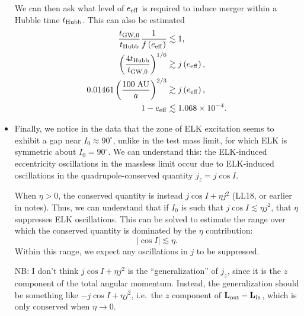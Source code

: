 \documentclass[11pt,
        usenames, %
        dvipsnames %
    ]{article}
\newcommand*{\bm}[1]{\boldsymbol{\mathbf{#1}}}
\newcommand*{\abs}[1]{\left|#1\right|}
\newcommand*{\p}[1]{\left(#1\right)}
\begin{document}
\begin{itemize}
        We can then ask what level of $e_{\rm eff}$ is required to induce
        merger within a Hubble time $t_{\rm Hubb}$. This can also be estimated
        \begin{align}
            \frac{t_{\rm GW, 0}}{t_{\rm Hubb}}\frac{1}{f\p{e_{\rm eff}}}
                &\lesssim 1,\\
            \p{\frac{4t_{\rm Hubb}}{t_{\rm GW, 0}}}^{1/6}
                &\gtrsim j\p{e_{\rm eff}},\\
            0.01461\p{\frac{100\;\mathrm{AU}}{a}}^{2/3} &\gtrsim
                j\p{e_{\rm eff}},\\
            1 - e_{\rm eff} &\lesssim 1.068 \times 10^{-4}.
        \end{align}

    \item Finally, we notice in the data that the zone of ELK excitation seems
        to exhibit a gap near $I_0 \approx 90^\circ$, unlike in the test mass
        limit, for which ELK is symmetric about $I_0 = 90^\circ$. We can
        understand this: the ELK-induced eccentricity oscillations in the
        massless limit occur due to ELK-induced oscillations in the
        quadrupole-conserved quantity $j_z = j\cos I$.

        When $\eta > 0$, the conserved quantity is instead $j\cos I + \eta j^2$
        (LL18, or earlier in notes). Thus, we can understand that if $I_0$ is
        such that $j\cos I \lesssim \eta j^2$, that $\eta$ suppresses ELK
        oscillations. This can be solved to estimate the range over which the
        conserved quantity is dominated by the $\eta$ contribution:
        \begin{equation}
            \abs{\cos I} \lesssim \eta.
        \end{equation}
        Within this range, we expect any oscillations in $j$ to be suppressed.

        NB\@: I don't think $j \cos I + \eta j^2$ is the ``generalization'' of
        $j_z$, since it is the $z$ component of the total angular momentum.
        Instead, the generalization should be something like $-j\cos I + \eta
        j^2$, i.e.\ the $z$ component of $\bm{L}_{\rm out} - \bm{L}_{\rm in}$,
        which is only conserved when $\eta \to 0$.
\end{itemize}
\end{document}
